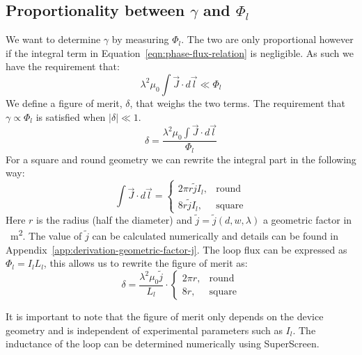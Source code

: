 \subsection{Proportionality between $\gamma$ and $\Phi_l$}
\label{sec:figure-of-merit}
We want to determine $\gamma$ by measuring $\Phi_l$. The two are only proportional however if the integral term in Equation~\ref{eqn:phase-flux-relation} is negligible. As such we have the requirement that:
\begin{equation*}
	\lambda^2\mu_0 \int \vec{J}\cdot d \vec{l} \ll \Phi_l
\end{equation*}
We define a figure of merit, $\delta$, that weighs the two terms. The requirement that $\gamma \propto \Phi_l$ is satisfied when $|\delta| \ll 1$.
\begin{equation}
	\delta = \frac{\lambda^2\mu_0 \int \vec{J}\cdot d \vec{l}}{\Phi_l}
\end{equation}
For a square and round geometry we can rewrite the integral part in the following way:
\begin{equation}
	\int \vec{J}\cdot d \vec{l} = \begin{cases}
		2\pi r \tilde{j} I_l, &\text{round} \\
		8r \tilde{j} I_l, &\text{square}
	\end{cases}
\end{equation}
Here $r$ is the radius (half the diameter) and $\tilde{j} = \tilde{j}(d, w, \lambda)$ a geometric factor in \unit{\per\square\meter}. The value of $\tilde{j}$ can be calculated numerically and details can be found in Appendix~\ref{app:derivation-geometric-factor-j}. The loop flux can be expressed as $\Phi_l = I_lL_l$, this allows us to rewrite the figure of merit as:
\begin{equation}
	\delta = \frac{\lambda^2\mu_0\tilde{j}}{L_l} \cdot \begin{cases}
		2\pi r, &\text{round} \\
		8r, &\text{square}
	\end{cases}
	\label{eqn:figure-of-merit}
\end{equation}

It is important to note that the figure of merit only depends on the device geometry and is independent of experimental parameters such as $I_l$. The inductance of the loop can be determined numerically using SuperScreen\cite{bishop-vanhornSuperScreenOpensourcePackage2022}.


